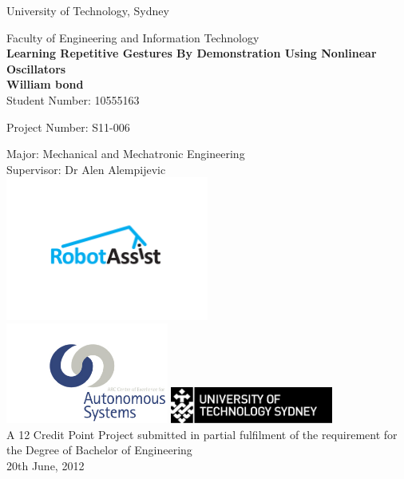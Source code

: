 \begin{titlepage}

\begin{center}
University of Technology, Sydney

Faculty of Engineering and Information Technology\\[1.0cm]

{  \bfseries Learning Repetitive Gestures By Demonstration Using Nonlinear Oscillators}\\[0.5cm]


\textbf{William bond}\\[1.0cm]

Student Number: 10555163

Project Number: S11-006

Major: Mechanical and Mechatronic Engineering\\[0.5cm]

Supervisor: Dr Alen Alempijevic\\[1.0cm]

\includegraphics[width=0.5\textwidth]{figures/ralogo}\\

\includegraphics[width=0.4\textwidth]{figures/caslogo}\hspace{20mm}
\includegraphics[width=0.4\textwidth]{figures/utslogo}\\[1cm]

A 12 Credit Point Project submitted in partial fulfilment of the requirement for the Degree of Bachelor of Engineering\\[1.5cm]

20th June, 2012

\end{center}

\end{titlepage}